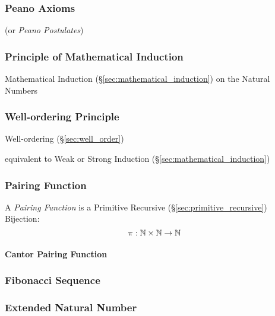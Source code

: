 \subsubsection{Peano Axioms}\label{sec:peano_axioms}

(or \emph{Peano Postulates})



\subsubsection{Principle of Mathematical Induction}
\label{sec:induction_principle}

Mathematical Induction (\S\ref{sec:mathematical_induction}) on the
Natural Numbers



\subsubsection{Well-ordering Principle}\label{sec:wellordering_principle}

Well-ordering (\S\ref{sec:well_order})

equivalent to Weak or Strong Induction (\S\ref{sec:mathematical_induction})



\subsubsection{Pairing Function}\label{sec:pairing_function}

A \emph{Pairing Function} is a Primitive Recursive
(\S\ref{sec:primitive_recursive}) Bijection:
\[
  \pi : \mathbb{N} \times \mathbb{N} \rightarrow \mathbb{N}
\]



\paragraph{Cantor Pairing Function}\label{sec:cantor_pairing}\hfill



\subsubsection{Fibonacci Sequence}\label{sec:fibonacci_sequence}

\subsubsection{Extended Natural Number}\label{sec:extended_natural}



